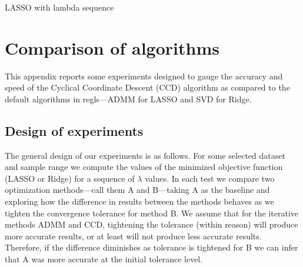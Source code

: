 \documentclass{article}
\newcommand{\startappendices}{%
\newcounter{appcount}
\setcounter{appcount}{0}
\renewcommand{\thesection}{Appendix \Alph{appcount}}}
\newcommand{\myappendix}[1]{%
\addtocounter{appcount}{1}
\section{#1}}
\begin{document}
\begin{script}
  \caption{LASSO with lambda sequence}
  \label{script:lamseq}
\end{script}




\clearpage
\startappendices

\myappendix{Comparison of algorithms}
\label{app:ccd}

This appendix reports some experiments designed to gauge the accuracy
and speed of the Cyclical Coordinate Descent (CCD) algorithm as
compared to the default algorithms in \textsf{regls}---ADMM for LASSO
and SVD for Ridge.

\subsection{Design of experiments}

The general design of our experiments is as follows. For some selected
dataset and sample range we compute the values of the minimized
objective function (LASSO or Ridge) for a sequence of $\lambda$
values. In each test we compare two optimization methods---call them A
and B---taking A as the baseline and exploring how the difference in
results between the methods behaves as we tighten the convergence
tolerance for method B. We assume that for the iterative methods ADMM
and CCD, tightening the tolerance (within reason) will produce more
accurate results, or at least will not produce less accurate
results. Therefore, if the difference diminishes as tolerance is
tightened for B we can infer that A was more accurate at the initial
tolerance level.
\end{document}
